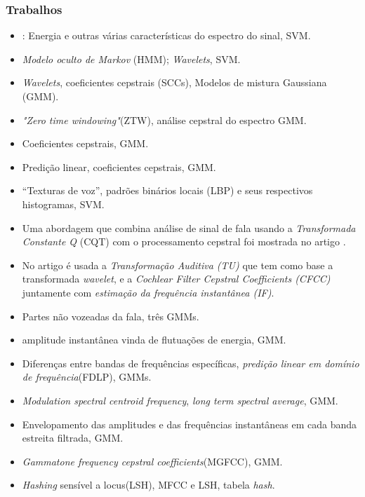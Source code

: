 \begin{frame}[allowframebreaks]
	\frametitle{Trabalhos}
	\begin{itemize}
		\item \cite{Ren2019}: Energia e outras várias características do espectro do sinal, SVM.
		\item \cite{DiqunYan2019} \textit{Modelo oculto de Markov} (HMM); \textit{Wavelets}, SVM.
		\item \cite{7802552} \textit{Wavelets}, coeficientes cepstrais (SCCs), Modelos de mistura Gaussiana (GMM).
		\item \cite{alluri2019replay} \textit{"Zero time windowing"}(ZTW), análise cepstral do espectro GMM.
		\item \cite{8725688} Coeficientes cepstrais, GMM.
		\item \cite{Hanilci2018} Predição linear, coeficientes cepstrais, GMM.
		\item \cite{ISI:000473343500086} ``Texturas de voz'', padrões binários locais (LBP) e seus respectivos histogramas, SVM.
		\item Uma abordagem que combina análise de sinal de fala usando a \textit{Transformada Constante Q} (CQT) com o processamento cepstral foi mostrada no artigo \cite{TODISCO2017516}.
		\item No artigo \cite{Patel2015} é usada a \textit{Transformação Auditiva (TU)} que tem como base a transformada \textit{wavelet}, e a \textit{Cochlear Filter Cepstral Coefficients (CFCC)} juntamente com  \textit{estimação da frequência instantânea (IF)}.
		\item \cite{ISI:000490497200068} Partes não vozeadas da fala, três GMMs.
		\item \cite{ISI:000465363900136} amplitude instantânea vinda de flutuações de energia, GMM.
		\item \cite{ISI:000465363900139} Diferenças entre bandas de frequências específicas, \textit{predição linear em domínio de frequência}(FDLP), GMMs.
		\item \cite{Suthokumar2018} \textit{Modulation  spectral  centroid  frequency}, \textit{long term spectral average}, GMM.
		\item \cite{ISI:000458728700054} Envelopamento das amplitudes e das frequências instantâneas em cada banda estreita filtrada, GMM.
		\item \cite{ISI:000392503100008} \textit{Gammatone frequency cepstral coefficients}(MGFCC), GMM.
		\item \cite{8396208} \textit{Hashing} sensível a locus(LSH), MFCC e LSH, tabela \textit{hash}. 
	\end{itemize}
\end{frame}
